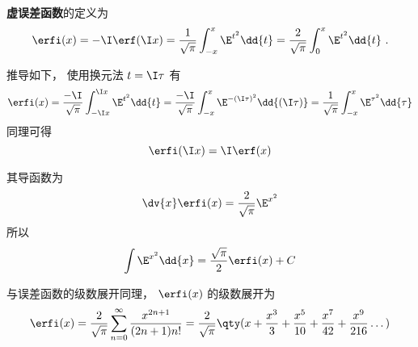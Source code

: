 

\textbf{虚误差函数}的定义为
\begin{equation}
\erfi(x) = -\I \erf(\I x) = \frac{1}{\sqrt{\pi}} \int_{-x}^x \E^{t^2} \dd{t}
= \frac{2}{\sqrt{\pi}} \int_0^x \E^{t^2} \dd{t}~.
\end{equation}

推导如下， 使用换元法 $t = \I \tau$ 有
\begin{equation}
\erfi(x) = \frac{-\I}{\sqrt{\pi}} \int_{-\I x}^{\I x} \E^{t^2} \dd{t}
= \frac{-\I}{\sqrt{\pi}} \int_{-x}^{x} \E^{-(\I \tau)^2} \dd{(\I \tau)}
= \frac{1}{\sqrt{\pi}} \int_{-x}^{x} \E^{\tau^2} \dd{\tau}
\end{equation}
同理可得
\begin{equation}
\erfi(\I x) = \I \erf(x)
\end{equation}

其导函数为
\begin{equation}
\dv{x} \erfi(x) = \frac{2}{\sqrt{\pi}} \E^{x^2}
\end{equation}
所以
\begin{equation}
\int \E^{x^2} \dd{x} = \frac{\sqrt{\pi}}{2} \erfi(x) + C
\end{equation}

与误差函数的级数展开同理， $\erfi(x)$ 的级数展开为
\begin{equation}
\erfi(x) = \frac{2}{\sqrt{\pi}} \sum_{n=0}^\infty \frac{x^{2n+1}}{(2n+1)n!}
= \frac{2}{\sqrt{\pi}}\qty(x + \frac{x^3}{3} + \frac{x^5}{10} + \frac{x^7}{42} + \frac{x^9}{216} \dots)
\end{equation}